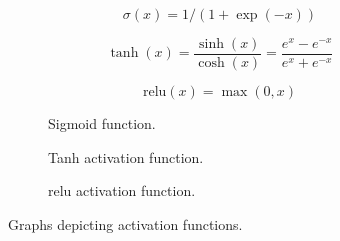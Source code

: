 \begin{equation}
\label{eq:sigmoid}
\sigma(x)=1/(1+\exp(-x))
\end{equation}

\begin{equation}
\label{eq:tanh}
\tanh(x)={\frac {\sinh(x)}{\cosh(x)}}={\frac {e^{x}-e^{-x}}{e^{x}+e^{-x}}}
\end{equation}

\begin{equation}
\label{eq:relu}
\text{relu}(x)=\max(0,x)
\end{equation}

\begin{figure}
\centering
    \begin{subfigure}[b]{0.3\textwidth}
        \caption{Sigmoid function.}
        \label{fig:activationfunctions.sigmoid}
    \end{subfigure}
    \hfill
    \begin{subfigure}[b]{0.3\textwidth}
        \caption{Tanh activation function.}
        \label{fig:activationfunctions.tanh}
    \end{subfigure}
    \hfill
    \begin{subfigure}[b]{0.3\textwidth}
        \caption{\gls{relu} activation function.}
        \label{fig:activationfunctions.relu}
    \end{subfigure}
    \caption{Graphs depicting activation functions.}
    \label{fig:activationfunctions}
\end{figure}

